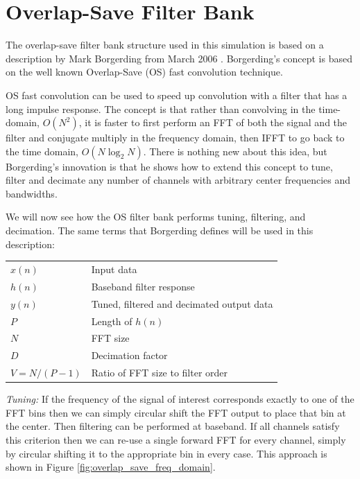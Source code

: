 \documentclass[12pt]{article}
\begin{document}
\section{Overlap-Save Filter Bank}
\label{sec:os_filter_bank}
The overlap-save filter bank structure used in this simulation is based
on a description by Mark Borgerding from March 2006
\cite{Borgerding1}.  Borgerding's concept is based on the well known
Overlap-Save (OS) fast convolution technique.

OS fast convolution can be used to speed up convolution with
a filter that has a long impulse response. The concept is that rather than
convolving in the time-domain, $O(N^2)$, it is faster to first
perform an FFT of both the signal and the filter and conjugate multiply in the
frequency domain, then IFFT to go back to the time domain, $O(N\log_2N)$.
There is nothing new about this idea, but Borgerding's innovation is that he
shows how to extend this concept to tune, filter and decimate any number of
channels with arbitrary center frequencies and bandwidths.

We will now see how the OS filter bank performs tuning, filtering, and
decimation. The same terms that Borgerding defines will be used in this
description:

\begin{center}
\begin{tabular}{ll}
    $x(n)$        & Input data \\
    $h(n)$        & Baseband filter response \\
    $y(n)$        & Tuned, filtered and decimated output data \\
    $P$           & Length of $h(n)$ \\
    $N$           & FFT size \\
    $D$           & Decimation factor \\
    $V = N/(P-1)$ & Ratio of FFT size to filter order \\
\end{tabular}
\end{center}

\emph{Tuning:} If the frequency of the signal of interest corresponds exactly
to one of the FFT bins then we can simply circular shift the FFT output to
place that bin at the center. Then filtering can be performed at baseband.  If
all channels satisfy this criterion then we can re-use a single forward FFT for
every channel, simply by circular shifting it to the appropriate bin in every
case.  This approach is shown in Figure \ref{fig:overlap_save_freq_domain}.
\end{document}
